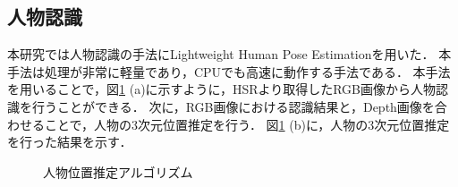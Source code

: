 \documentclass[a4j]{jarticle}
\begin{document}
\subsection{人物認識}
本研究では人物認識の手法にLightweight Human Pose Estimation\cite{light-openpose}を用いた．
本手法は処理が非常に軽量であり，CPUでも高速に動作する手法である．
本手法を用いることで，図\ref{human_estimation_explain} (a)に示すように，HSRより取得したRGB画像から人物認識を行うことができる．
次に，RGB画像における認識結果と，Depth画像を合わせることで，人物の3次元位置推定を行う．
図\ref{human_estimation_explain} (b)に，人物の3次元位置推定を行った結果を示す．
\begin{figure}[b]
  \centering
  \caption{人物位置推定アルゴリズム}
  \label{human_estimation_explain}
\end{figure}
\end{document}

